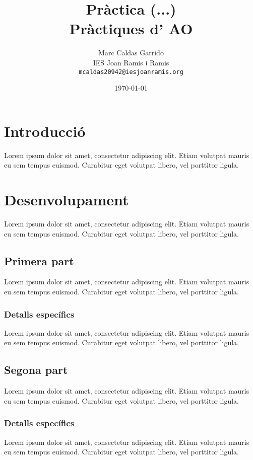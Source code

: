 \documentclass[a4paper,12pt]{report}
\title{
    \textbf{Pràctica (...)} \\ 
    \large Pràctiques d' AO
}
\author{Marc Caldas Garrido \\
    IES Joan Ramis i Ramis\\
    \texttt{mcaldas20942@iesjoanramis.org}}
\date{\today}
\begin{document}
\maketitle
\thispagestyle{empty} %
\newpage

\tableofcontents
\newpage

\chapter{Introducció}
Lorem ipsum dolor sit amet, consectetur adipiscing elit. Etiam volutpat mauris eu sem tempus euismod. Curabitur eget volutpat libero, vel porttitor ligula.

\chapter{Desenvolupament}
Lorem ipsum dolor sit amet, consectetur adipiscing elit. Etiam volutpat mauris eu sem
tempus euismod. Curabitur eget volutpat libero, vel porttitor ligula.

\section{Primera part}
Lorem ipsum dolor sit amet, consectetur adipiscing elit. Etiam volutpat mauris eu sem
tempus euismod. Curabitur eget volutpat libero, vel porttitor ligula.

\subsection{Detalls específics}
Lorem ipsum dolor sit amet, consectetur adipiscing elit. Etiam volutpat mauris eu sem
tempus euismod. Curabitur eget volutpat libero, vel porttitor ligula.

\section{Segona part}
Lorem ipsum dolor sit amet, consectetur adipiscing elit. Etiam volutpat mauris eu sem
tempus euismod. Curabitur eget volutpat libero, vel porttitor ligula.

\subsection{Detalls específics}
Lorem ipsum dolor sit amet, consectetur adipiscing elit. Etiam volutpat mauris eu sem
tempus euismod. Curabitur eget volutpat libero, vel porttitor ligula.
\end{document}
